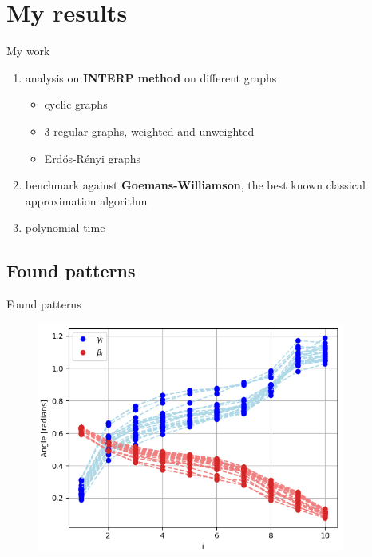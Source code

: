 \documentclass{beamer}
\begin{document}
{\section{My results}
\begin{frame}{My work}
\begin{enumerate}
	\item analysis on \textbf{INTERP method} on different graphs
	\begin{itemize}
		\item cyclic graphs
		\item 3-regular graphs, weighted and unweighted
		\item Erd\H{o}s-R\'enyi graphs
	\end{itemize}
	\item benchmark against \textbf{Goemans-Williamson}, the best known classical approximation algorithm
	\item polynomial time
\end{enumerate}
\end{frame}

\subsection{Found patterns}
\begin{frame}{Found patterns}
\begin{figure}
	\centering
	\includegraphics[width=0.9\textwidth]{figures/pattern_3-regular_12-nodal}
\end{figure}
\end{frame}

}
\end{document}
